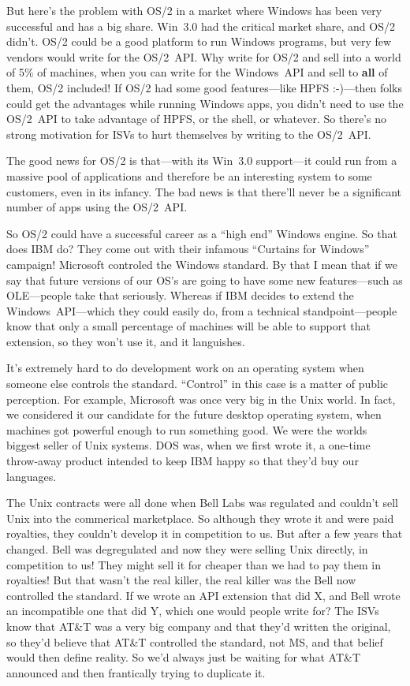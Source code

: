 But here's the problem with OS/2 in a market where Windows has been
very successful and has a big share.  Win~3.0 had the critical
market share, and OS/2 didn't.  OS/2 could be a good platform to run
Windows programs, but very few vendors would write for the OS/2~API\hbox{}.
Why write for OS/2 and sell into a world of 5\% of machines, when
you can write for the Windows~API and sell to {\bf all} of them, OS/2 included!
If OS/2 had some good features---like HPFS :-)---then folks could get
the advantages while running Windows apps, you didn't need to use
the OS/2~API to take advantage of HPFS, or the shell, or whatever.  
So there's no strong
motivation for ISVs to hurt themselves by writing to the OS/2~API.

The good news for OS/2 is that---with its Win~3.0 support---it could
run from a massive pool of applications and therefore be an interesting
system to some customers, even in its infancy.  The bad news is that
there'll never be a significant number of apps using the OS/2~API.  

So OS/2 could have a successful career as a ``high end'' Windows engine.
So that does IBM do?  They come out with their infamous ``Curtains for
Windows'' campaign!  Microsoft controled the Windows standard.  By that
I mean that if we say that future versions of our OS's are going to
have some new features---such as OLE---people take that seriously.
Whereas if IBM decides to extend the Windows~API---which they could
easily do, from a technical standpoint---people know that only a small
percentage of machines will be able to support that extension, so they
won't use it, and it languishes.

It's extremely hard to do development work on an operating system when
someone else controls the standard.  ``Control'' in this case is a matter
of public perception.  For example, Microsoft was once very big in the 
Unix world.  In fact, we considered it our candidate for the future
desktop operating system, when machines got powerful enough to run something
good.  We were the worlds biggest seller of Unix systems.  DOS was, 
when we first wrote it, a one-time throw-away product intended to
keep IBM happy so that they'd buy our languages.

The Unix contracts were all done when Bell Labs was regulated and couldn't
sell Unix into the commerical marketplace.  So although they wrote it
and were paid royalties, they couldn't develop it in competition to us.
But after a few years that changed.  Bell was degregulated and now they
were selling Unix directly, in competition to us!  They might sell it for
cheaper than we had to pay them in royalties!  But that wasn't the real
killer, the real killer was the Bell now controlled the standard.  If
we wrote an API extension that did X, and Bell wrote an incompatible one
that did Y, which one would people write for?  The ISVs know that AT\&T
was a very big company and that they'd written the original, so they'd
believe that AT\&T controlled the standard, not MS, and that belief would
then define reality.  So we'd always just be waiting for what AT\&T announced
and then frantically trying to duplicate it.

